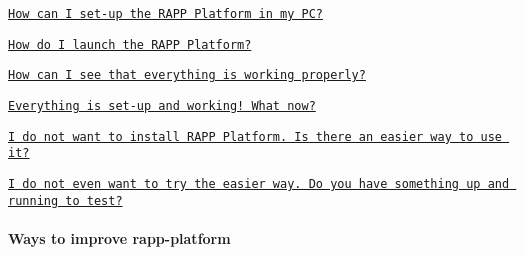 \begin{DoxyItemize}
\item \href{https://github.com/rapp-project/rapp-platform/wiki/How-can-I-set-up-the-RAPP-Platform-in-my-PC%3F}{\tt How can I set-\/up the R\-A\-P\-P Platform in my P\-C?}
\item \href{https://github.com/rapp-project/rapp-platform/wiki/How-do-I-launch-the-RAPP-Platform%3F}{\tt How do I launch the R\-A\-P\-P Platform?}
\item \href{https://github.com/rapp-project/rapp-platform/wiki/How-can-I-see-that-everything-is-working-properly%3F}{\tt How can I see that everything is working properly?}
\item \href{https://github.com/rapp-project/rapp-platform/wiki/Everything-is-set-up-and-working!-What-now%3F}{\tt Everything is set-\/up and working! What now?}
\item \href{https://github.com/rapp-project/rapp-platform/wiki/I-do-not-want-to-install-RAPP-Platform.-Is-there-an-easier-way-to-use-it%3F}{\tt I do not want to install R\-A\-P\-P Platform. Is there an easier way to use it?}
\item \href{https://github.com/rapp-project/rapp-platform/wiki/I-do-not-even-want-to-try-the-easier-way.-Do-you-have-something-up-and-running-to-test%3F}{\tt I do not even want to try the easier way. Do you have something up and running to test?}
\end{DoxyItemize}

\paragraph*{Ways to improve rapp-\/platform}


